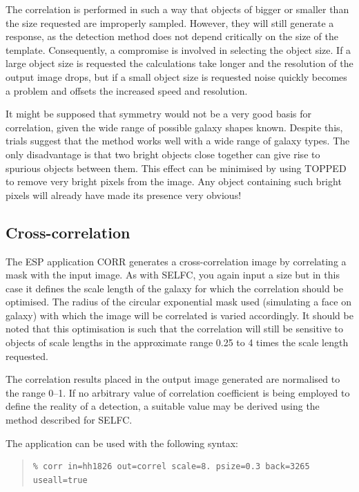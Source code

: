 \documentclass[twoside,11pt]{article}
\newenvironment{myquote}{\begin{quote}\begin{small}}{\end{small}\end{quote}}
\begin{document}
The correlation is performed in such a way that objects of
bigger or smaller than the size requested are improperly sampled. However, 
they will still generate a response, as the detection method does not depend
critically on the size of the template. Consequently, a compromise is 
involved in selecting the object size. If a large object size is requested 
the calculations take longer and the resolution of the output image drops, 
but if a small object size is requested noise quickly 
becomes a problem and offsets the increased speed and resolution.

It might be supposed that symmetry would not be a very good basis for correlation,
given the wide range of possible galaxy shapes known. Despite this, 
trials suggest that the method works well with a wide range of galaxy
types. The only disadvantage is that two bright objects close together can
give rise to spurious objects between them. This effect can be minimised by
using TOPPED to remove very bright pixels from the image. Any object containing
such bright pixels will already have made its presence very obvious!

\subsection{Cross-correlation}

The ESP application CORR generates a cross-correlation image by correlating
a mask with the input image. As with SELFC, you again input a size but in 
this case it defines the scale length of the galaxy for which the correlation 
should be optimised. The radius of the circular exponential mask used 
(simulating a face on galaxy) with which the image will be correlated 
is varied accordingly. It should be noted that this optimisation is such that 
the correlation will still be sensitive to objects of scale lengths in the 
approximate range 0.25 to 4 times the scale length requested.

The correlation results placed in the output image generated are 
normalised to the range 0--1. If no arbitrary value 
of correlation coefficient is being employed to define the reality of a detection,
a suitable value may be derived using the method described for SELFC. 

The application can be used with the following syntax:

\begin{myquote}
\begin{verbatim}
% corr in=hh1826 out=correl scale=8. psize=0.3 back=3265 useall=true
\end{verbatim}
\end{myquote}
\end{document}
